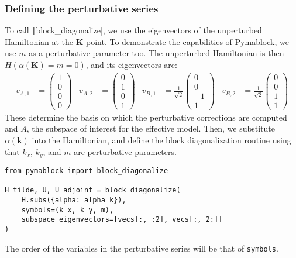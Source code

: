\subsubsection{Defining the perturbative series}


To call \texttt|block_diagonalize|, we use the eigenvectors of the unperturbed
Hamiltonian at the $\mathbf{K}$ point.
To demonstrate the capabilities of Pymablock, we use $m$ as a perturbative
parameter too.
The unperturbed Hamiltonian is then $H(\alpha(\mathbf{K}) = m = 0)$, and its
eigenvectors are:
%
\begin{align}
v_{A,1} &= \begin{pmatrix} 1 \\ 0 \\ 0 \\ 0 \end{pmatrix} &
v_{A,2} &= \begin{pmatrix} 0 \\ 1 \\ 0 \\ 1 \end{pmatrix} &
v_{B,1} &= \frac{1}{\sqrt{2}} \begin{pmatrix} 0 \\ 0 \\ -1 \\ 1 \end{pmatrix} &
v_{B,2} &= \frac{1}{\sqrt{2}} \begin{pmatrix} 0 \\ 0 \\ 1 \\ 1 \end{pmatrix}
\end{align}
%
These determine the basis on which the perturbative corrections are computed
and $A$, the subspace of interest for the effective model.
Then, we substitute $\alpha(\mathbf{k})$ into the Hamiltonian, and define the
block diagonalization routine using that $k_x$, $k_y$, and $m$ are perturbative
parameters.
%
\begin{verbatim}
from pymablock import block_diagonalize

H_tilde, U, U_adjoint = block_diagonalize(
    H.subs({alpha: alpha_k}),
    symbols=(k_x, k_y, m),
    subspace_eigenvectors=[vecs[:, :2], vecs[:, 2:]]
)
\end{verbatim}
%
The order of the variables in the perturbative series will be that of \texttt{symbols}.

